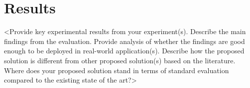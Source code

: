 \section{Results}
\label{sec:results}

<Provide key experimental results from your experiment(s). Describe the main
findings from the evaluation. Provide analysis of whether the findings are good
enough to be deployed in real-world application(s). Describe how the proposed
solution is different from other proposed solution(s) based on the literature.
Where does your proposed solution stand in terms of standard evaluation
compared to the existing state of the art?>
